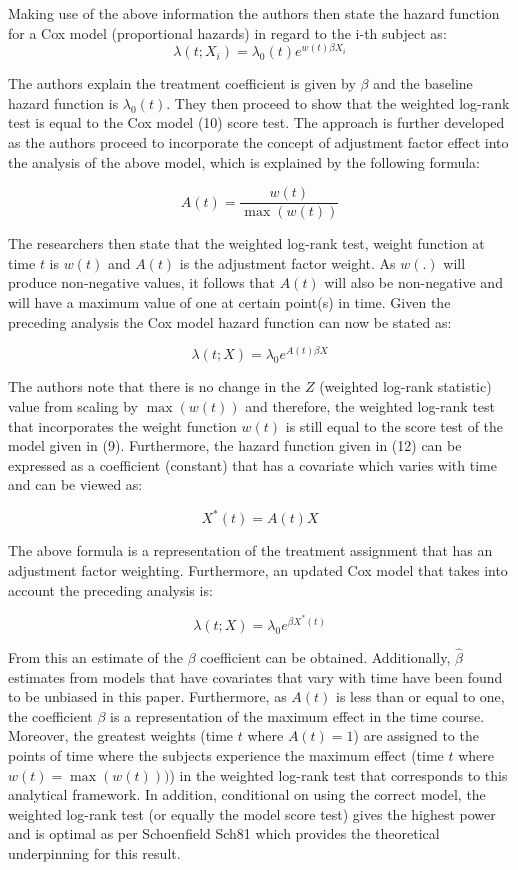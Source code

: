 \documentclass[12pt,twoside]{reedthesis}
\begin{document}
Making use of the above information the authors then state the hazard function for a Cox model (proportional hazards) in regard to the i-th subject as:
\[\lambda\left(t ; X_{i}\right)=\lambda_{0}(t) e^{w(t) \beta X_{i}}\]

The authors explain the treatment coefficient is given by \(\beta\) and the baseline hazard function is \(\lambda_{0}(t)\).
They then proceed to show that the weighted log-rank test is equal to the Cox model (10) score test. The approach is further developed as the authors proceed to incorporate the concept of adjustment factor effect into the analysis of the above model, which is explained by the following formula:

\[A(t)=\frac{w(t)}{\max (w(t))}\]

The researchers then state that the weighted log-rank test, weight function at time \(\textit{t}\) is \(w(t)\) and \(A(t)\) is the adjustment factor weight. As \(w( .)\) will produce non-negative values, it follows that \(A(t)\) will also be non-negative and will have a maximum value of one at certain point(s) in time. Given the preceding analysis the Cox model hazard function can now be stated as:

\[\lambda(t ; X)=\lambda_{0} e^{A(t) \beta X}\]

The authors note that there is no change in the \(\textit{Z}\) (weighted log-rank statistic) value from scaling by
\(\max (w(t))\) and therefore, the weighted log-rank test that incorporates the weight function \(w(t)\) is still equal to the score test of the model given in (9). Furthermore, the hazard function given in (12) can be expressed as a coefficient (constant) that has a covariate which varies with time and can be viewed as:

\[X^{*}(t)=A(t) X\]

The above formula is a representation of the treatment assignment that has an adjustment factor weighting. Furthermore, an updated Cox model that takes into account the preceding analysis is:

\[\lambda(t ; X)=\lambda_{0} e^{\beta X^{*}(t)}\]

From this an estimate of the \(\beta\) coefficient can be obtained. Additionally, \(\hat{\beta}\) estimates from models that have covariates that vary with time have been found to be unbiased in this paper. Furthermore, as \(A(t)\) is less than or equal to one, the coefficient \(\beta\) is a representation of the maximum effect in the time course. Moreover, the greatest weights (time \(\textit{t}\) where \(A(t)=1\)) are assigned to the points of time where the subjects experience the maximum effect (time \(\textit{t}\) where \(w(t)=\max (w(t)))\)) in the weighted log-rank test that corresponds to this analytical framework. In addition, conditional on using the correct model, the weighted log-rank test (or equally the model score test) gives the highest power and is optimal as per Schoenfield Sch81 which provides the theoretical underpinning for this result.
\end{document}
